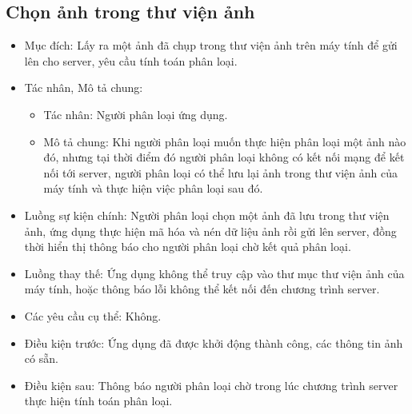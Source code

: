 \subsection{Chọn ảnh trong thư viện ảnh}
\begin{itemize}
	\item Mục đích: Lấy ra một ảnh đã chụp trong thư viện ảnh trên máy tính để gửi lên cho server, yêu cầu tính toán phân loại.
	\item Tác nhân, Mô tả chung:
	\begin{itemize}
		\item Tác nhân: Người phân loại ứng dụng.
		\item Mô tả chung: Khi người phân loại muốn thực hiện phân loại một ảnh nào đó, nhưng tại thời điểm đó người phân loại không có kết nối mạng để kết nối tới server, người phân loại có thể lưu lại ảnh	trong thư viện ảnh của máy tính và thực hiện việc phân loại sau đó.
	\end{itemize}	
	\item Luồng sự kiện chính: Người phân loại chọn một ảnh đã lưu trong thư viện ảnh, ứng dụng thực hiện mã hóa và nén dữ liệu ảnh rồi gửi lên server, đồng thời hiển thị thông báo cho người phân loại chờ kết quả phân loại.
	\item Luồng thay thế: Ứng dụng không thể truy cập vào thư mục thư viện ảnh của máy tính, hoặc thông báo lỗi không thể kết nối đến chương trình server.
	\item Các yêu cầu cụ thể: Không.
	\item Điều kiện trước: Ứng dụng đã được khởi động thành công, các thông tin ảnh có sẵn.
	\item Điều kiện sau: Thông báo người phân loại chờ trong lúc chương trình server thực hiện tính toán phân loại.
\end{itemize}

